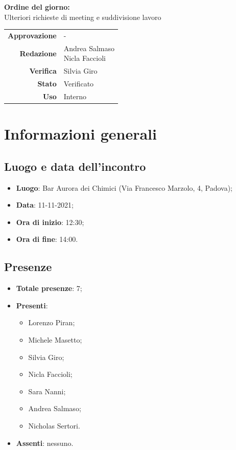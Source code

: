 \documentclass[11pt]{article}
\begin{document}
\begin{titlepage}
\begin{center}
			\large
			
			\vfill
			\large \textbf{Ordine del giorno:} \\
			Ulteriori richieste di meeting e suddivisione lavoro\\
			\vfill
			
			\begin{tabular}{r|l}
				\textbf{Approvazione} &  -\\
				\textbf{Redazione} &  \parbox[t]{3.5cm}{Andrea Salmaso \\Nicla Faccioli}\\
				\textbf{Verifica} &  Silvia Giro\\
				\textbf{Stato} & Verificato \\
				\textbf{Uso} & Interno
			\end{tabular}
			\vfill
			
		\end{center}
	\end{titlepage}

	\newpage
	
	\section{Informazioni generali}
	\subsection{Luogo e data dell'incontro}
	\begin{itemize}
		\item \textbf{Luogo}: Bar Aurora dei Chimici (Via Francesco Marzolo, 4, Padova);
		\item \textbf{Data}: 11-11-2021;
		\item \textbf{Ora di inizio}: 12:30;
		\item \textbf{Ora di fine}: 14:00.
	\end{itemize}
	
	\subsection{Presenze}
	\begin{itemize}
		\item \textbf{Totale presenze}: 7;
		\item \textbf{Presenti}:
		\begin{itemize}
			\item Lorenzo Piran; 
			\item Michele Masetto;
			\item Silvia Giro;
			\item Nicla Faccioli;
			\item Sara Nanni;
			\item Andrea Salmaso;
			\item Nicholas Sertori.
		\end{itemize}
		\item \textbf{Assenti}: nessuno.
	\end{itemize}
\end{document}
